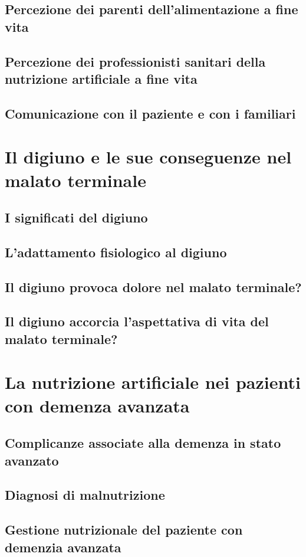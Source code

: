 \documentclass[11pt,a4paper,oneside]{book}
\begin{document}
\section{Percezione dei parenti dell'alimentazione a fine vita}
\section{Percezione dei professionisti sanitari della nutrizione artificiale a fine vita}
\section{Comunicazione con il paziente e con i familiari }

\chapter{Il digiuno e le sue conseguenze nel malato terminale}
\section{I significati del digiuno}
\section{L'adattamento fisiologico al digiuno}
\section{Il digiuno provoca dolore nel malato terminale?}
\section{Il digiuno accorcia l'aspettativa di vita del malato terminale?}

\chapter{La nutrizione artificiale nei pazienti con demenza avanzata}
\section{Complicanze associate alla demenza in stato avanzato}
\section{Diagnosi di malnutrizione}
\section{Gestione nutrizionale del paziente con demenzia avanzata}
\end{document}
